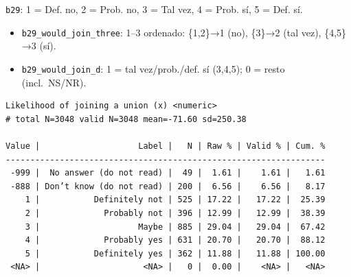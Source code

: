 \documentclass[
  letterpaper,
  DIV=11,
  numbers=noendperiod]{scrreprt}
\newenvironment{Shaded}{\begin{snugshade}}{\end{snugshade}}
\newcommand{\FunctionTok}[1]{\textcolor[rgb]{0.28,0.35,0.67}{#1}}
\newcommand{\NormalTok}[1]{\textcolor[rgb]{0.00,0.23,0.31}{#1}}
\newcommand{\SpecialCharTok}[1]{\textcolor[rgb]{0.37,0.37,0.37}{#1}}
\providecommand{\tightlist}{%
  \setlength{\itemsep}{0pt}\setlength{\parskip}{0pt}}
\begin{document}
\texttt{b29}: 1 = Def. no, 2 = Prob. no, 3 = Tal vez, 4 = Prob. sí, 5 =
Def. sí.

\begin{itemize}
\tightlist
\item
  \texttt{b29\_would\_join\_three}: 1--3 ordenado: \{1,2\}→1 (no),
  \{3\}→2 (tal vez), \{4,5\}→3 (sí).
\item
  \texttt{b29\_would\_join\_d}: 1 = tal vez/prob./def. sí (3,4,5); 0 =
  resto (incl.~NS/NR).
\end{itemize}

\begin{Shaded}
\end{Shaded}

\begin{verbatim}
Likelihood of joining a union (x) <numeric> 
# total N=3048 valid N=3048 mean=-71.60 sd=250.38

Value |                    Label |   N | Raw % | Valid % | Cum. %
-----------------------------------------------------------------
 -999 |  No answer (do not read) |  49 |  1.61 |    1.61 |   1.61
 -888 | Don’t know (do not read) | 200 |  6.56 |    6.56 |   8.17
    1 |           Definitely not | 525 | 17.22 |   17.22 |  25.39
    2 |             Probably not | 396 | 12.99 |   12.99 |  38.39
    3 |                    Maybe | 885 | 29.04 |   29.04 |  67.42
    4 |             Probably yes | 631 | 20.70 |   20.70 |  88.12
    5 |           Definitely yes | 362 | 11.88 |   11.88 | 100.00
 <NA> |                     <NA> |   0 |  0.00 |    <NA> |   <NA>
\end{verbatim}
\end{document}
